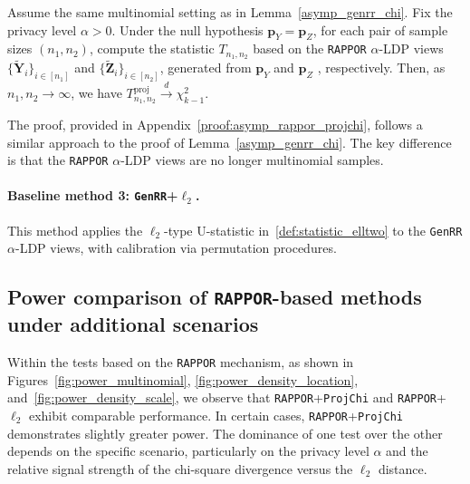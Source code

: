 \documentclass[twoside,11pt]{article}
\newcommand{\alphabetSize}{k} %
\newcommand{\sampleSize}{n}
\newcommand{\privacyParameter}{\alpha} %
\begin{document}
\begin{appendix}
	\begin{lemma} \label{asymp_rappor_projchi} 
		Assume the same multinomial setting as in Lemma~\ref{asymp_genrr_chi}.
		Fix the privacy level $\privacyParameter>0$.
		Under the null hypothesis $\mathbf{p}_Y = \mathbf{p}_Z$, for each pair of sample sizes $(n_1, n_2)$, compute the statistic $T_{n_1, n_2}$ based on the  \textnormal{\texttt{RAPPOR}} $\privacyParameter$-LDP views $\{\tilde{\mathbf{Y}}_i\}_{i \in [n_1]}$ and $\{\tilde{\mathbf{Z}}_i\}_{i \in [n_2]}$, generated from $\mathbf{p}_Y$ and $\mathbf{p}_Z$ , respectively. Then, as $n_1, n_2 \to \infty$, we have $T^{\mathrm{proj}}_{\sampleSize_1, \sampleSize_2}
		\stackrel{d}{\to} \chi^2_{\alphabetSize-1}$.
	\end{lemma}
	The proof, provided in Appendix~\ref{proof:asymp_rappor_projchi}, follows a similar approach to the proof of Lemma~\ref{asymp_genrr_chi}. The key difference is that the \texttt{RAPPOR} $\privacyParameter$-LDP views are no longer multinomial samples.
	\paragraph{Baseline method 3: \texttt{GenRR}+$\ell_2$.} This method applies the $\ell_2$-type U-statistic in~\eqref{def:statistic_elltwo} to the \texttt{GenRR} $\privacyParameter$-LDP views, with calibration via  permutation procedures.
	\subsection{Power comparison of \texttt{RAPPOR}-based methods under additional scenarios }\label{appendix:powerlaw}
	Within the tests based on the \texttt{RAPPOR} mechanism, as shown in Figures~\ref{fig:power_multinomial}, \ref{fig:power_density_location}, and~\ref{fig:power_density_scale}, we observe that \texttt{RAPPOR}+\texttt{ProjChi} and \texttt{RAPPOR}+$\ell_2$ exhibit comparable performance. In certain cases, \texttt{RAPPOR}+\texttt{ProjChi} demonstrates slightly greater power. The dominance of one test over the other depends on the specific scenario, particularly on the privacy level $\privacyParameter$ and the relative signal strength of the chi-square divergence versus the $\ell_2$ distance. 
	

\end{appendix}
\end{document}
